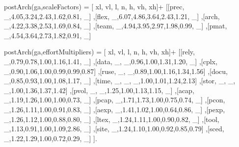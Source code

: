 postArch(ga,scaleFactors) =
            [ xl,  vl,   l,   n,   h,  vh,  xh]+
    [[prec,   _,4.05,3.24,2.43,1.62,0.81,    _]
    ,[flex,    _,6.07,4.86,3.64,2.43,1.21,   _]
    ,[arch,    _,4.22,3.38,2.53,1.69,0.84,   _]
    ,[team,    _,4.94,3.95,2.97,1.98,0.99,   _]
    ,[pmat,    _,4.54,3.64,2.73,1.82,0.91,   _]

 postArch(ga,effortMultipliers) =
            [ xl,  vl,   l,   n,   h,  vh,  xh]+
    [[rely,    _,0.79,0.78,1.00,1.16,1.41,   _]
    ,[data,    _,   _,0.96,1.00,1.31,1.20,   _]
    ,[cplx,    _,0.90,1.06,1.00,0.99,0.99,0.87]
    ,[ruse,    _,   _,0.89,1.00,1.16,1.34,1.56]
    ,[docu,    _,0.85,0.93,1.00,1.08,1.17,   _]
    ,[time,    _,   _,   _,1.00,1.01,1.24,2.13]
    ,[stor,    _,   _,   _,1.00,1.36,1.37,1.42]
    ,[pvol,    _,   _,1.25,1.00,1.13,1.15,   _]
    ,[acap,    _,1.19,1.26,1.00,1.00,0.73,   _]
    ,[pcap,    _,1.71,1.73,1.00,0.75,0.74,   _]
    ,[pcon,    _,1.26,1.11,1.00,0.91,0.83,   _]
    ,[aexp,    _,1.41,1.02,1.00,0.64,0.86,   _]
    ,[pexp,    _,1.26,1.12,1.00,0.88,0.80,   _]
    ,[ltex,    _,1.24,1.11,1.00,0.90,0.82,   _]
    ,[tool,    _,1.13,0.91,1.00,1.09,2.86,   _]
    ,[site,    _,1.24,1.10,1.00,0.92,0.85,0.79]
    ,[sced,    _,1.22,1.29,1.00,0.72,0.29,   _]
    ].

